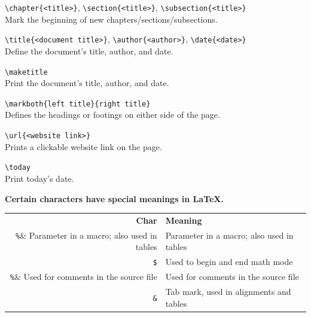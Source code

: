 \par
\verb|\chapter{<title>}|, \verb|\section{<title>}|, \verb|\subsection{<title>}|\\
Mark the beginning of new chapters/sections/subsections.
\par
\verb|\title{<document title>}|, \verb|\author{<author>}|, \verb|\date{<date>}|\\
Define the document's title, author, and date.
\par
\verb|\maketitle|\\
Print the document's title, author, and date.
\par
\verb|\markboth{left title}{right title}|\\
Defines the headings or footings on either side of the page.
\par
\verb|\url{<website link>}|\\
Prints a clickable website link on the page.
\par
\verb|\today|\\
Print today's date.
\par
{\large\textbf{Certain characters have special meanings in \LaTeX.}}\\
\begin{tabular}{r|l}
\textbf{Char} & \textbf{Meaning} \\
\verb|%|& Parameter in a macro; also used in tables \\ 
\verb|$|& Used to begin and end math mode \\
\verb|%|& Used for comments in the source file \\
\verb|&|& Tab mark, used in alignments and tables \\
\end{tabular}
\par

